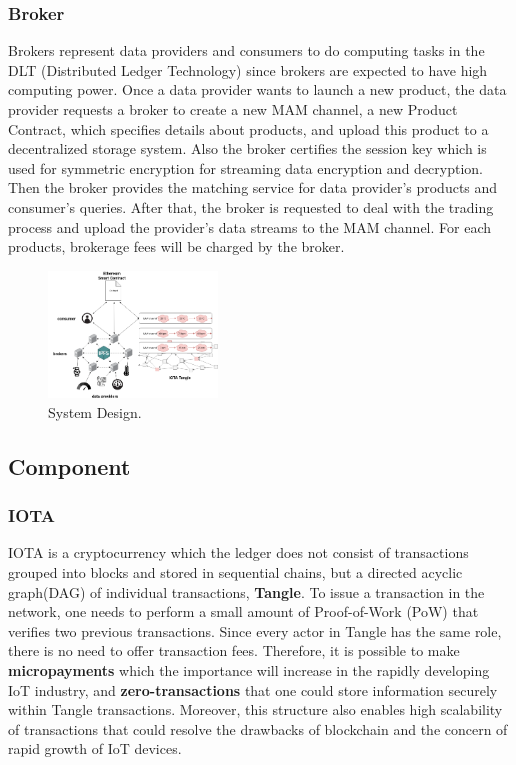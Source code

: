 \documentclass[journal,a4paper]{IEEEtran}
\begin{document}
\subsubsection{Broker}
Brokers represent data providers and consumers to do computing tasks in the DLT (Distributed Ledger Technology) since brokers are expected to have high computing power. Once a data provider wants to launch a new product, the data provider requests a broker to create a new MAM channel, a new Product Contract, which specifies details about products, and upload this product to a decentralized storage system\cite{IPFS}. Also the broker certifies the session key which is used for symmetric encryption for streaming data encryption and decryption. Then the broker provides the matching service for data provider’s products and consumer’s queries. After that, the broker is requested to deal with the trading process and upload the provider’s data streams to the MAM channel. For each products, brokerage fees will be charged by the broker.

\begin{figure}[h]
	\centering
	\includegraphics[width=0.4\textwidth]{system_design}
	\caption{System Design.}
	\label{fig:system_design}
\end{figure}

\subsection{Component}
\subsubsection{IOTA}
IOTA\cite{IOTAwhitepaper} is a cryptocurrency which the ledger does not consist of transactions grouped into blocks and stored in sequential chains, but a directed acyclic graph(DAG) of individual transactions, \textbf{Tangle}. To issue a transaction in the network, one needs to perform a small amount of Proof-of-Work (PoW) that verifies two previous transactions. Since every actor in Tangle has the same role, there is no need to offer transaction fees. Therefore, it is possible to make \textbf{micropayments} which the importance will increase in the rapidly developing IoT industry, and \textbf{zero-transactions} that one could store information securely within Tangle transactions. Moreover, this structure also enables high scalability of transactions that could resolve the drawbacks of blockchain and the concern of rapid growth of IoT devices.
\end{document}
